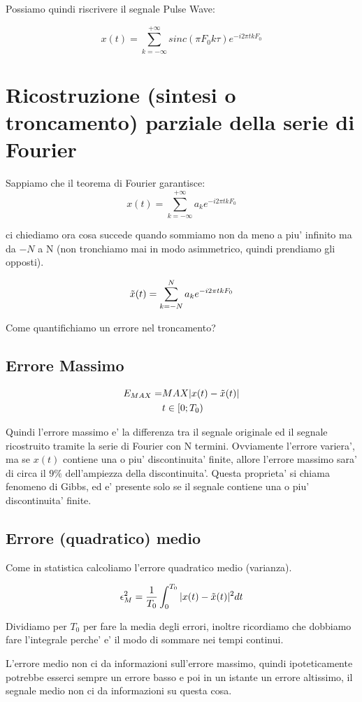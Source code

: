 Possiamo quindi riscrivere il segnale Pulse Wave:

\[
    x(t) = \sum_{k = - \infty}^{+ \infty} sinc(\pi F_0 k \tau) e^{-i2 \pi t k F_0}
\]

\section{Ricostruzione (sintesi o troncamento) parziale della serie di Fourier}
Sappiamo che il teorema di Fourier garantisce:
\[
    x(t) = \sum_{k = - \infty}^{+ \infty} a_k e^{-i2 \pi t k F_0}
\]

ci chiediamo ora cosa succede quando sommiamo non da meno a piu' infinito ma da $-N$ a N (non tronchiamo mai in modo asimmetrico, quindi prendiamo gli opposti).

\[
   \Tilde{x}(t) = \sum_{k = -N}^{N} a_k e^{-i2 \pi t k F_0}
\]

Come quantifichiamo un errore nel troncamento?

\subsection{Errore Massimo}
\[\begin{split}
    E_{MAX} = &MAX|x(t) - \Tilde{x}(t)| \\
    &t \in [0; T_0)
\end{split}\]

Quindi l'errore massimo e' la differenza tra il segnale originale ed il segnale ricostruito tramite la serie di Fourier con N termini.
Ovviamente l'errore variera', ma se $x(t)$ contiene una o piu' discontinuita' finite, allore l'errore massimo sara' di circa il $9\%$ dell'ampiezza della discontinuita'. Questa proprieta' si chiama fenomeno di Gibbs, ed e' presente solo se il segnale contiene una o piu' discontinuita' finite.

\subsection{Errore (quadratico) medio}

Come in statistica calcoliamo l'errore quadratico medio (varianza).

\[
    \epsilon_M^2 = \frac{1}{T_0} \int_0^{T_0} |x(t) - \Tilde{x}(t)|^2 dt
\]

Dividiamo per $T_0$ per fare la media degli errori, inoltre ricordiamo che dobbiamo fare l'integrale perche' e' il modo di sommare nei tempi continui.

L'errore medio non ci da informazioni sull'errore massimo, quindi ipoteticamente potrebbe esserci sempre un errore basso e poi in un istante un errore altissimo, il segnale medio non ci da informazioni su questa cosa.

